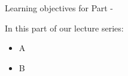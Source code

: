 
\begin{frame}[t,allowframebreaks]{
    Learning objectives for Part \thispart -}

    In this part of our lecture series:
    \begin{itemize}
        \item A
        \item B
    \end{itemize}

\end{frame}
